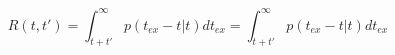 \begin{equation}
R(t,t') = \int_{t+t'}^\infty p(t_{ex}-t|t) dt_{ex}  = \int_{t+t'}^\infty p(t_{ex}-t|t) dt_{ex}
\end{equation}